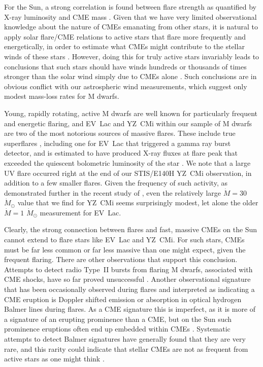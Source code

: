 \documentclass[preprint]{aastex}
\begin{document}
     For the Sun, a strong correlation is found between flare strength
as quantified by X-ray luminosity and CME mass \citep[e.g.,][]{ana11}.
Given that we have very
limited observational knowledge about the nature of CMEs emanating
from other stars, it is natural to apply solar flare/CME
relations to active stars that flare more frequently and energetically,
in order to estimate what CMEs might contribute to the stellar winds of
these stars \citep{spm19}.  However, doing this for truly
active stars invariably leads to conclusions that such stars should
have winds hundreds or thousands of times stronger than the solar
wind simply due to CMEs alone \citep[e.g.,][]{jjd13,po17}.  Such
conclusions are in obvious conflict with our astrospheric wind
measurements, which suggest only modest mass-loss rates for M dwarfs.

     Young, rapidly rotating, active M dwarfs are well known for
particularly frequent and energetic flaring, and EV~Lac and YZ~CMi
within our sample of M dwarfs are two of the most notorious sources
of massive flares.  These include true superflares
\citep[e.g.,][]{afk10}, including one for EV~Lac that triggered
a gamma ray burst detector, and is estimated to have produced X-ray
fluxes at flare peak that exceeded the quiescent bolometric luminosity
of the star \citep{rao10}.  We note that a large
UV flare occurred right at the end of our STIS/E140H YZ~CMi
observation, in addition to a few smaller flares.  Given the frequency
of such activity, as demonstrated further in the recent study of
\citet{hm21}, even the relatively large
$\dot{M}=30$ $\dot{M}_{\odot}$ value that we find for YZ~CMi seems
surprisingly modest, let alone the older $\dot{M}=1$ $\dot{M}_{\odot}$
measurement for EV~Lac.

     Clearly, the strong connection between flares and fast, massive
CMEs on the Sun cannot extend to flare stars like EV~Lac and YZ~CMi.
For such stars, CMEs must be far less common or far less massive
than one might expect,
given the frequent flaring.  There are other observations that support
this conclusion.  Attempts to detect radio Type~II bursts from
flaring M dwarfs, associated with CME shocks, have so far proved
unsuccessful \citep{mkc18a,mkc18b,jv19}.
Another observational signature
that has been occasionally observed during flares and interpreted as
indicating a CME eruption is Doppler shifted emission or absorption
in optical hydrogen Balmer lines during flares.  As a CME signature this
is imperfect, as it is more of a signature of an erupting prominence
than a CME, but on the Sun such prominence eruptions often end up
embedded within CMEs \citep{bew17}.
Systematic attempts to detect Balmer signatures have generally found
that they are very rare, and this rarity could indicate that stellar
CMEs are not as frequent from active stars as one might think
\citep{ml20,pm20,po20}.
\end{document}
